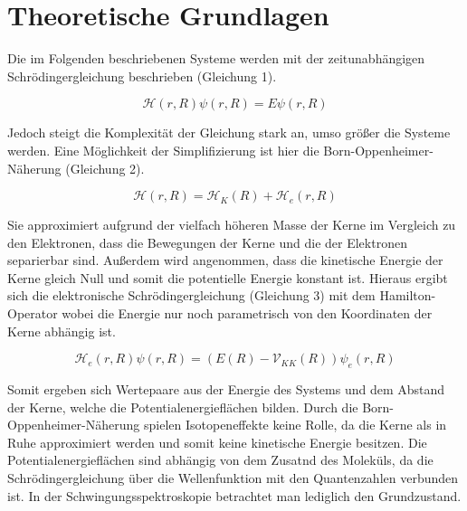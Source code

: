 %
%

\section{Theoretische Grundlagen}

Die im Folgenden beschriebenen Systeme werden mit der zeitunabhängigen Schrödingergleichung beschrieben (Gleichung 1). 

\begin {equation}
\mathcal{H}\left(r,R\right)\psi\left(r,R\right)=E\psi\left(r,R\right)
\end {equation}

Jedoch steigt die Komplexität der Gleichung stark an, umso größer die Systeme werden. Eine Möglichkeit der Simplifizierung ist hier die Born-Oppenheimer-Näherung (Gleichung 2). 

\begin {equation}
\mathcal{H}\left(r,R\right)=\mathcal{H}_{K}\left(R\right)+\mathcal{H}_{e}\left(r,R\right)
\end {equation}

Sie approximiert aufgrund der vielfach höheren Masse der Kerne im Vergleich zu den Elektronen, dass die Bewegungen der Kerne und die der Elektronen separierbar sind. Außerdem wird angenommen, dass die kinetische Energie der Kerne gleich Null und somit die potentielle Energie konstant ist.
Hieraus ergibt sich die elektronische Schrödingergleichung (Gleichung 3) mit dem Hamilton-Operator wobei die Energie nur noch parametrisch von den Koordinaten der Kerne abhängig ist.

\begin {equation}
\mathcal{H}_e\left(r,R\right)\psi\left(r,R\right)=\left(E\left(R\right)-\mathcal{V}_{KK}\left(R\right)\right)\psi_e\left(r,R\right)
\end {equation}

 Somit ergeben sich Wertepaare aus der Energie des Systems und dem Abstand der Kerne, welche die Potentialenergieflächen bilden.
Durch die Born-Oppenheimer-Näherung spielen Isotopeneffekte keine Rolle, da die Kerne als in Ruhe approximiert werden und somit keine kinetische Energie besitzen.
Die Potentialenergieflächen sind abhängig von dem Zusatnd des Moleküls, da die Schrödingergleichung über die Wellenfunktion mit den Quantenzahlen verbunden ist. In der Schwingungsspektroskopie betrachtet man lediglich den Grundzustand.


%